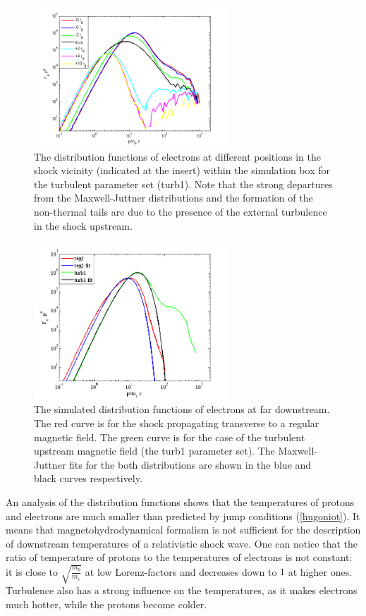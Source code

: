 \documentclass[a4paper]{jpconf}
\begin{document}
	\begin{figure}[h!]
		\centering
		\includegraphics[width=0.65\textwidth]{fig/electrons_at_points.png} 
		\caption{The distribution functions of electrons at different positions in the shock vicinity (indicated at the insert) within the simulation box for the  turbulent parameter set (turb1). Note that the strong departures from the Maxwell-Juttner distributions and the formation of the non-thermal tails are due to the presence of the external turbulence in the shock upstream.}
		\label{points}
	\end{figure}
	
	\begin{figure}[h!]
		\centering
		\includegraphics[width=0.65\textwidth]{fig/temperature_fit.png} 
		\caption{The simulated distribution functions of electrons at far downstream. The red curve is for the shock propagating transverse to a regular magnetic field. The green curve is for the case of the turbulent upstream magnetic field (the turb1 parameter set). The Maxwell-Juttner fits for the both distributions are shown in the blue and black curves respectively.}
		\label{temp_fit}
	\end{figure}
	
	An analysis of the distribution functions shows that the temperatures of protons and electrons are much smaller than predicted by jump conditions (\ref{hugoniot}). It means that magnetohydrodynamical formalism is not sufficient for the description of downstream temperatures of a relativistic shock wave. One can notice that the ratio of temperature of protons to the temperatures of electrons is not constant: it is close to $\sqrt{\frac{m_p}{m_e}}$ at low Lorenz-factors and decreases down to $1$ at higher ones. Turbulence also has a strong influence on the temperatures, as it makes electrons much hotter, while the protons become colder. 
	
\end{document}
